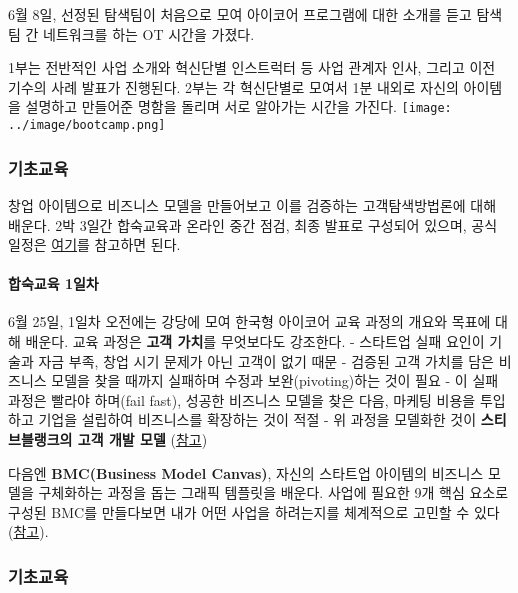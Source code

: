 \documentclass[
  letterpaper,
  DIV=11,
  numbers=noendperiod]{scrartcl}
\let\oldparagraph\paragraph
\renewcommand{\paragraph}[1]{\oldparagraph{#1}\mbox{}}
\begin{document}
6월 8일, 선정된 탐색팀이 처음으로 모여 아이코어 프로그램에 대한 소개를
듣고 탐색팀 간 네트워크를 하는 OT 시간을 가졌다.

1부는 전반적인 사업 소개와 혁신단별 인스트럭터 등 사업 관계자 인사,
그리고 이전 기수의 사례 발표가 진행된다. 2부는 각 혁신단별로 모여서 1분
내외로 자신의 아이템을 설명하고 만들어준 명함을 돌리며 서로 알아가는
시간을 가진다. \texttt{[image: ../image/bootcamp.png]}

\hypertarget{uxae30uxcd08uxad50uxc721}{%
\subsubsection{기초교육}\label{uxae30uxcd08uxad50uxc721}}

창업 아이템으로 비즈니스 모델을 만들어보고 이를 검증하는
고객탐색방법론에 대해 배운다. 2박 3일간 합숙교육과 온라인 중간 점검,
최종 발표로 구성되어 있으며, 공식 일정은
\href{../image/basicEducation_syllabus.png}{여기}를 참고하면 된다.

\hypertarget{uxd569uxc219uxad50uxc721-1uxc77cuxcc28}{%
\paragraph{합숙교육
1일차}\label{uxd569uxc219uxad50uxc721-1uxc77cuxcc28}}

6월 25일, 1일차 오전에는 강당에 모여 한국형 아이코어 교육 과정의 개요와
목표에 대해 배운다. 교육 과정은 \textbf{고객 가치}를 무엇보다도
강조한다. - 스타트업 실패 요인이 기술과 자금 부족, 창업 시기 문제가 아닌
고객이 없기 때문 - 검증된 고객 가치를 담은 비즈니스 모델을 찾을 때까지
실패하며 수정과 보완(pivoting)하는 것이 필요 - 이 실패 과정은 빨라야
하며(fail fast), 성공한 비즈니스 모델을 찾은 다음, 마케팅 비용을
투입하고 기업을 설립하여 비즈니스를 확장하는 것이 적절 - 위 과정을
모델화한 것이 \textbf{스티브블랭크의 고객 개발 모델}
(\href{https://brunch.co.kr/@kbhpmp/31}{참고})

다음엔 \textbf{BMC(Business Model Canvas)}, 자신의 스타트업 아이템의
비즈니스 모델을 구체화하는 과정을 돕는 그래픽 템플릿을 배운다. 사업에
필요한 9개 핵심 요소로 구성된 BMC를 만들다보면 내가 어떤 사업을
하려는지를 체계적으로 고민할 수 있다
(\href{https://brunch.co.kr/@givemore/3}{참고}).

\hypertarget{uxae30uxcd08uxad50uxc721-1}{%
\subsubsection{기초교육}\label{uxae30uxcd08uxad50uxc721-1}}
\end{document}
